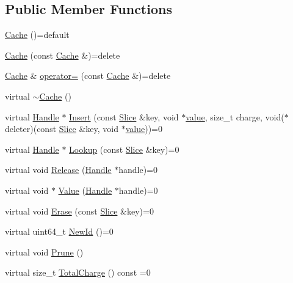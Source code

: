 \subsection*{Public Member Functions}
\begin{DoxyCompactItemize}
\item 
\mbox{\hyperlink{classleveldb_1_1_cache_a1ea9879243055a2818df8409a8a20182}{Cache}} ()=default
\item 
\mbox{\hyperlink{classleveldb_1_1_cache_aea6c5e0f3cd7bda18d9bab61d794e28c}{Cache}} (const \mbox{\hyperlink{classleveldb_1_1_cache}{Cache}} \&)=delete
\item 
\mbox{\hyperlink{classleveldb_1_1_cache}{Cache}} \& \mbox{\hyperlink{classleveldb_1_1_cache_ae632af1297651c42d750ba2ffc0cbfb5}{operator=}} (const \mbox{\hyperlink{classleveldb_1_1_cache}{Cache}} \&)=delete
\item 
virtual \mbox{\hyperlink{classleveldb_1_1_cache_ac1e9269aeca06d6d5c1c10d895913314}{$\sim$\+Cache}} ()
\item 
virtual \mbox{\hyperlink{structleveldb_1_1_cache_1_1_handle}{Handle}} $\ast$ \mbox{\hyperlink{classleveldb_1_1_cache_af0b55b7fa0e64184fa62e0dbe9ba9eae}{Insert}} (const \mbox{\hyperlink{classleveldb_1_1_slice}{Slice}} \&key, void $\ast$\mbox{\hyperlink{version__set_8cc_a38c8b88c432e666ad10b0c5573e1160a}{value}}, size\+\_\+t charge, void($\ast$deleter)(const \mbox{\hyperlink{classleveldb_1_1_slice}{Slice}} \&key, void $\ast$\mbox{\hyperlink{version__set_8cc_a38c8b88c432e666ad10b0c5573e1160a}{value}}))=0
\item 
virtual \mbox{\hyperlink{structleveldb_1_1_cache_1_1_handle}{Handle}} $\ast$ \mbox{\hyperlink{classleveldb_1_1_cache_af90785205182a25cf741dc13a48d76cb}{Lookup}} (const \mbox{\hyperlink{classleveldb_1_1_slice}{Slice}} \&key)=0
\item 
virtual void \mbox{\hyperlink{classleveldb_1_1_cache_a712618c8bf3bfa48b7bab1fbc23c3002}{Release}} (\mbox{\hyperlink{structleveldb_1_1_cache_1_1_handle}{Handle}} $\ast$handle)=0
\item 
virtual void $\ast$ \mbox{\hyperlink{classleveldb_1_1_cache_a454920df8e68917adcf011dfb3538661}{Value}} (\mbox{\hyperlink{structleveldb_1_1_cache_1_1_handle}{Handle}} $\ast$handle)=0
\item 
virtual void \mbox{\hyperlink{classleveldb_1_1_cache_af833a38763598253338de37aba079db6}{Erase}} (const \mbox{\hyperlink{classleveldb_1_1_slice}{Slice}} \&key)=0
\item 
virtual uint64\+\_\+t \mbox{\hyperlink{classleveldb_1_1_cache_ae2d79bfe747fc6c165c77398cc31e125}{New\+Id}} ()=0
\item 
virtual void \mbox{\hyperlink{classleveldb_1_1_cache_a2b517fe5e854f6923a357bffa1bb4fa3}{Prune}} ()
\item 
virtual size\+\_\+t \mbox{\hyperlink{classleveldb_1_1_cache_a4ccef9422e919a7e5a1ffb64443f88ef}{Total\+Charge}} () const =0
\end{DoxyCompactItemize}


